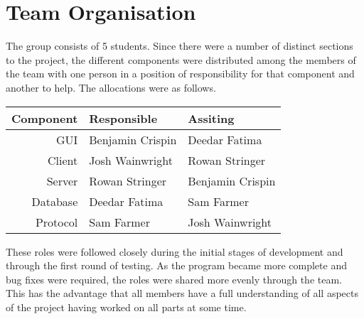 \section{Team Organisation}
\label{sec:team_organisation}

The group consists of 5 students. Since there were a number of distinct
sections to the project, the different components were distributed among the
members of the team with one person in a position of responsibility for that
component and another to help. The allocations were as follows.

\begin{table}[htbp]
	\centering
	\begin{tabular}{@{}rll@{}}
		\toprule
\textbf{Component} & \textbf{Responsible} & \textbf{Assiting} \\ \midrule
		GUI              & Benjamin Crispin & Deedar Fatima    \\
		Client           & Josh Wainwright  & Rowan Stringer   \\
		Server           & Rowan Stringer   & Benjamin Crispin \\
		Database         & Deedar Fatima    & Sam Farmer       \\
		Protocol         & Sam Farmer       & Josh Wainwright  \\
		\bottomrule
	\end{tabular}
\end{table}

These roles were followed closely during the initial stages of development and
through the first round of testing. As the program became more complete and bug
fixes were required, the roles were shared more evenly through the team. This
has the advantage that all members have a full understanding of all aspects of
the project having worked on all parts at some time.
